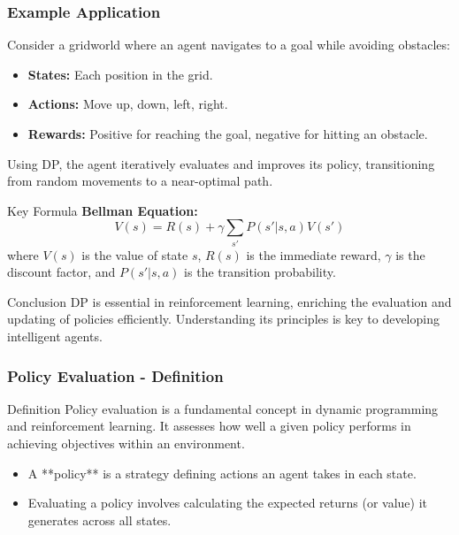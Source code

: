 \documentclass[aspectratio=169]{beamer}
\begin{document}
\begin{frame}[fragile]
    \frametitle{Example Application}
    Consider a gridworld where an agent navigates to a goal while avoiding obstacles:
    \begin{itemize}
        \item \textbf{States:} Each position in the grid.
        \item \textbf{Actions:} Move up, down, left, right.
        \item \textbf{Rewards:} Positive for reaching the goal, negative for hitting an obstacle.
    \end{itemize}
    
    Using DP, the agent iteratively evaluates and improves its policy, transitioning from random movements to a near-optimal path.

    \begin{block}{Key Formula}
        \textbf{Bellman Equation:}
        \begin{equation}
            V(s) = R(s) + \gamma \sum_{s'} P(s' | s, a) V(s')
        \end{equation}
        where \( V(s) \) is the value of state \( s \), \( R(s) \) is the immediate reward, 
        \( \gamma \) is the discount factor, and \( P(s' | s, a) \) is the transition probability.
    \end{block}

    \begin{block}{Conclusion}
        DP is essential in reinforcement learning, enriching the evaluation and updating of policies efficiently. Understanding its principles is key to developing intelligent agents.
    \end{block}
\end{frame}

\begin{frame}[fragile]
    \frametitle{Policy Evaluation - Definition}
    \begin{block}{Definition}
        Policy evaluation is a fundamental concept in dynamic programming and reinforcement learning. It assesses how well a given policy performs in achieving objectives within an environment.
    \end{block}
    
    \begin{itemize}
        \item A **policy** is a strategy defining actions an agent takes in each state.
        \item Evaluating a policy involves calculating the expected returns (or value) it generates across all states.
    \end{itemize}
\end{frame}
\end{document}
